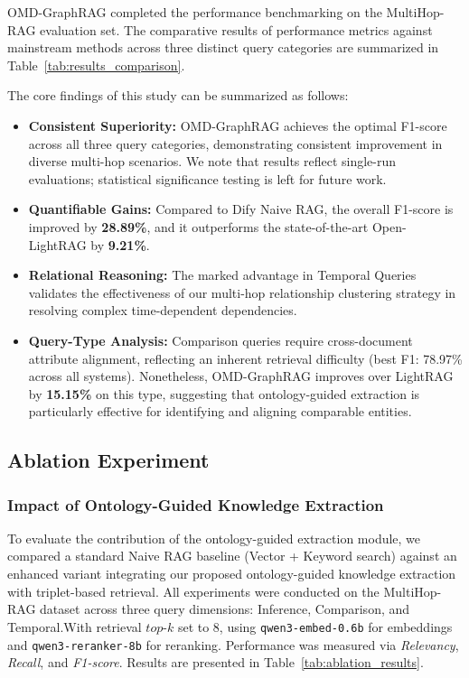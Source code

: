 \documentclass[11pt]{article}
\begin{document}
OMD-GraphRAG completed the performance benchmarking on the MultiHop-RAG evaluation set. The comparative results of performance metrics against mainstream methods across three distinct query categories are summarized in Table~\ref{tab:results_comparison}.

The core findings of this study can be summarized as follows:

\begin{itemize}[nosep]
\item \textbf{Consistent Superiority:} OMD-GraphRAG achieves the optimal F1-score across all three query categories, demonstrating consistent improvement in diverse multi-hop scenarios. We note that results reflect single-run evaluations; statistical significance testing is left for future work.

\item \textbf{Quantifiable Gains:} Compared to Dify Naive RAG, the overall F1-score is improved by \textbf{28.89\%}, and it outperforms the state-of-the-art Open-LightRAG by \textbf{9.21\%}.


\item \textbf{Relational Reasoning:} The marked advantage in Temporal Queries validates the effectiveness of our multi-hop relationship clustering strategy in resolving complex time-dependent dependencies.

\item \textbf{Query-Type Analysis:} Comparison queries require cross-document attribute alignment, reflecting an inherent retrieval difficulty (best F1: 78.97\% across all systems). Nonetheless, OMD-GraphRAG improves over LightRAG by \textbf{15.15\%} on this type, suggesting that ontology-guided extraction is particularly effective for identifying and aligning comparable entities.
\end{itemize}

\subsection{Ablation Experiment}
\subsubsection{Impact of Ontology-Guided Knowledge Extraction}

To evaluate the contribution of the ontology-guided extraction module, we compared a standard Naive RAG baseline (Vector + Keyword search) against an enhanced variant integrating our proposed ontology-guided knowledge extraction with triplet-based retrieval. All experiments were conducted on the MultiHop-RAG dataset across three query dimensions: Inference, Comparison, and Temporal.With retrieval $top\text{-}k$ set to 8, using \texttt{qwen3-embed-0.6b} for embeddings and \texttt{qwen3-reranker-8b} for reranking. Performance was measured via \textit{Relevancy}, \textit{Recall}, and \textit{F1-score}. Results are presented in Table~\ref{tab:ablation_results}.
\end{document}
